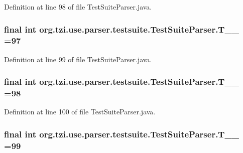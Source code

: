Definition at line 98 of file Test\-Suite\-Parser.\-java.

\hypertarget{classorg_1_1tzi_1_1use_1_1parser_1_1testsuite_1_1_test_suite_parser_a884cf8f0f5c34a8f27c3f8cd7dfd92be}{
\subsubsection[{T\-\_\-\-\_\-97}]{\setlength{\rightskip}{0pt plus 5cm}final int org.\-tzi.\-use.\-parser.\-testsuite.\-Test\-Suite\-Parser.\-T\-\_\-\-\_ =97\hspace{0.3cm}{\ttfamily [static]}}}\label{classorg_1_1tzi_1_1use_1_1parser_1_1testsuite_1_1_test_suite_parser_a884cf8f0f5c34a8f27c3f8cd7dfd92be}


Definition at line 99 of file Test\-Suite\-Parser.\-java.

\hypertarget{classorg_1_1tzi_1_1use_1_1parser_1_1testsuite_1_1_test_suite_parser_ae125d74903203113659222b8a845d6dc}{
\subsubsection[{T\-\_\-\-\_\-98}]{\setlength{\rightskip}{0pt plus 5cm}final int org.\-tzi.\-use.\-parser.\-testsuite.\-Test\-Suite\-Parser.\-T\-\_\-\-\_ =98\hspace{0.3cm}{\ttfamily [static]}}}\label{classorg_1_1tzi_1_1use_1_1parser_1_1testsuite_1_1_test_suite_parser_ae125d74903203113659222b8a845d6dc}


Definition at line 100 of file Test\-Suite\-Parser.\-java.

\hypertarget{classorg_1_1tzi_1_1use_1_1parser_1_1testsuite_1_1_test_suite_parser_a25f88d2808a7c7c43cee3b1e5cb7aaa6}{
\subsubsection[{T\-\_\-\-\_\-99}]{\setlength{\rightskip}{0pt plus 5cm}final int org.\-tzi.\-use.\-parser.\-testsuite.\-Test\-Suite\-Parser.\-T\-\_\-\-\_ =99\hspace{0.3cm}{\ttfamily [static]}}}\label{classorg_1_1tzi_1_1use_1_1parser_1_1testsuite_1_1_test_suite_parser_a25f88d2808a7c7c43cee3b1e5cb7aaa6}


